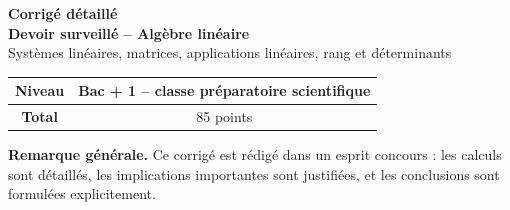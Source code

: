 \documentclass[11pt,a4paper]{article}
\begin{document}
\begin{center}
    {\Huge \textbf{Corrigé détaillé}}\\[0.2cm]
    {\Large \textbf{Devoir surveillé -- Algèbre linéaire}}\\[0.2cm]
    {\large Systèmes linéaires, matrices, applications linéaires, rang et déterminants}\\[0.4cm]
\end{center}

\begin{center}
\begin{tabular}{|>{\bfseries}c|c|}
\hline
Niveau & Bac + 1 -- classe préparatoire scientifique \\
\hline
Total & 85 points \\
\hline
\end{tabular}
\end{center}

\vspace{0.3cm}

\textbf{Remarque générale.}  
Ce corrigé est rédigé dans un esprit concours : les calculs sont détaillés, les implications importantes sont justifiées, et les conclusions sont formulées explicitement.
\end{document}
